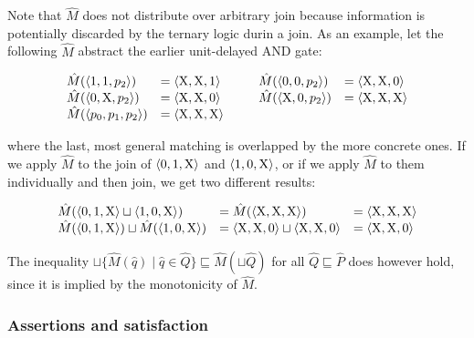 Note that $\hat M$ does not distribute over arbitrary join because information is potentially discarded by the ternary logic durin a join. As an example, let the following $\hat M$ abstract the earlier unit-delayed AND gate:


\begin{equation*}
\begin{array}{llll}
  \hat M(\langle 1, 1, p_{2} \rangle) & = \langle \mathrm{X}, \mathrm{X}, 1 \rangle \qquad & \hat M(\langle 0, 0, p_{2} \rangle) & = \langle \mathrm{X}, \mathrm{X}, 0 \rangle \\
  \hat M(\langle 0, \mathrm{X}, p_{2} \rangle) & = \langle \mathrm{X}, \mathrm{X}, 0 \rangle & \hat M(\langle \mathrm{X}, 0, p_{2} \rangle) & = \langle \mathrm{X}, \mathrm{X}, \mathrm{X} \rangle \\
  \hat M(\langle p_{0}, p_{1}, p_{2} \rangle) & = \langle \mathrm{X}, \mathrm{X}, \mathrm{X} \rangle & &
\end{array}
\end{equation*}


\noindent where the last, most general matching is overlapped by the more concrete ones. If we apply $\hat M$ to the join of $\langle 0, 1, \mathrm{X} \rangle$ and $\langle 1, 0, \mathrm{X} \rangle$, or if we apply $\hat M$ to them individually and then join, we get two different results:

\begin{equation*}
\begin{array}{lll}
  \hat M(\langle 0, 1, \mathrm{X} \rangle \sqcup \langle 1, 0, \mathrm{X} \rangle) &= \hat M(\langle \mathrm{X}, \mathrm{X}, \mathrm{X} \rangle) &= \langle \mathrm{X}, \mathrm{X}, \mathrm{X} \rangle \\
  \hat M(\langle 0, 1, \mathrm{X} \rangle) \sqcup \hat M(\langle 1, 0, \mathrm{X} \rangle) &= \langle \mathrm{X}, \mathrm{X}, 0 \rangle \sqcup \langle \mathrm{X}, \mathrm{X}, 0 \rangle &= \langle \mathrm{X}, \mathrm{X}, 0 \rangle
\end{array}
\end{equation*}

\noindent The inequality $\sqcup \{ \hat M(\hat q) \mid \hat q \in \hat Q \} \sqsubseteq \hat M(\sqcup \hat Q)$ for all $\hat Q \sqsubseteq \hat P$ does however hold, since it is implied by the monotonicity of $\hat M$.

\subsubsection{Assertions and satisfaction}

